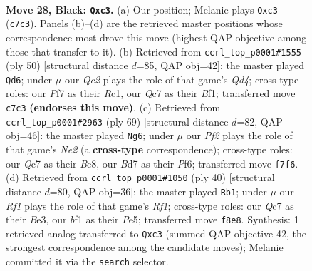 \documentclass[11pt]{article}
\begin{document}
\clearpage

\begin{figure}[p]\centering
\begin{subfigure}{0.46\textwidth}\centering
\resizebox{\linewidth}{!}{%
\newchessgame
\chessboard[
  setfen={1n3rk1/2qb1ppp/8/4Pp2/p4P2/2P5/P1P2KPP/1Q3BNR b - - 0 28},
  showmover=false,
  pgfstyle=straightmove, color=movearrow, markmove={c7-c3}
]}
\caption{}
\end{subfigure}\hfill
\begin{subfigure}{0.46\textwidth}\centering
\resizebox{\linewidth}{!}{%
\newchessgame
\chessboard[
  setfen={5rk1/1q2npp1/pp2p2p/8/PP1Q4/8/5PPP/2R2BK1 w - - 3 26},
  showmover=false,
  pgfstyle=straightmove, color=movearrow, markmove={d4-d6}
]}
\caption{}
\end{subfigure}
\\[4pt]
\begin{subfigure}{0.46\textwidth}\centering
\resizebox{\linewidth}{!}{%
\newchessgame
\chessboard[
  setfen={2b5/ppr1n1kp/1q3p2/3p2p1/3P2P1/P6P/1P1QBP2/4RNK1 b - - 8 35},
  showmover=false,
  pgfstyle=straightmove, color=movearrow, markmove={e7-g6}
]}
\caption{}
\end{subfigure}\hfill
\begin{subfigure}{0.46\textwidth}\centering
\resizebox{\linewidth}{!}{%
\newchessgame
\chessboard[
  setfen={1r4k1/3qb1pp/Q3p3/2ppP3/8/1PP1B3/5PPP/5RK1 w - - 1 21},
  showmover=false,
  pgfstyle=straightmove, color=movearrow, markmove={f1-b1}
]}
\caption{}
\end{subfigure}
\caption{\textbf{Move 28, Black: \texttt{Qxc3}.} (a) Our position; Melanie plays \texttt{Qxc3} (\texttt{c7c3}). Panels (b)--(d) are the retrieved master positions whose correspondence most drove this move (highest QAP objective among those that transfer to it). (b) Retrieved from \texttt{ccrl\_top\_p0001\#1555} (ply 50) [structural distance $d$=85, QAP obj=42]: the master played \texttt{Qd6}; under $\mu$ our \emph{Qc2} plays the role of that game's \emph{Qd4}; cross-type roles: our \emph{P}f7 as their \emph{R}c1, our \emph{Q}c7 as their \emph{B}f1; transferred move \texttt{c7c3} \textbf{(endorses this move)}. (c) Retrieved from \texttt{ccrl\_top\_p0001\#2963} (ply 69) [structural distance $d$=82, QAP obj=46]: the master played \texttt{Ng6}; under $\mu$ our \emph{Pf2} plays the role of that game's \emph{Ne2} (a \textbf{cross-type} correspondence); cross-type roles: our \emph{Q}c7 as their \emph{B}c8, our \emph{B}d7 as their \emph{P}f6; transferred move \texttt{f7f6}. (d) Retrieved from \texttt{ccrl\_top\_p0001\#1050} (ply 40) [structural distance $d$=80, QAP obj=36]: the master played \texttt{Rb1}; under $\mu$ our \emph{Rf1} plays the role of that game's \emph{Rf1}; cross-type roles: our \emph{Q}c7 as their \emph{B}e3, our \emph{b}f1 as their \emph{P}e5; transferred move \texttt{f8e8}. Synthesis: 1 retrieved analog transferred to \texttt{Qxc3} (summed QAP objective 42, the strongest correspondence among the candidate moves); Melanie committed it via the \texttt{search} selector.}
\label{fig:thought-m55}
\end{figure}
\end{document}
